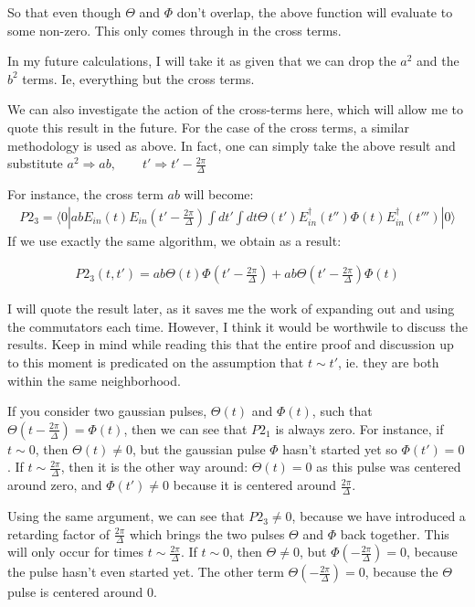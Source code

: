 \documentclass[12pt]{article}
\begin{document}
So that even though $\Theta$ and $\Phi$ don't overlap, the above function will evaluate to some non-zero. This only comes through in the cross terms.

In my future calculations, I will take it as given that we can drop the $a^2$ and the $b^2$ terms. Ie, everything but the cross terms.


We can also investigate the action of the cross-terms here, which will allow me to quote this result in the future. For the case of the cross terms, a similar methodology is used as above. In fact, one can simply take the above result and substitute $a^2 \Rightarrow ab,\qquad t' \Rightarrow t'-\frac{2 \pi}{\Delta}$

For instance, the cross term $ab$ will become:
\begin{align}
P2_3 =\langle 0 | abE_{in}(t) E_{in}(t'-\frac{2 \pi}{\Delta}) \int d t' \int dt \Theta (t') E^\dagger_{in}(t'') \Phi (t) E^\dagger_{in}(t''') | 0\rangle
\end{align}
If we use exactly the same algorithm, we obtain as a result:

\begin{align}
P2_3(t,t') = ab \Theta(t)\Phi(t'-\frac{2 \pi}{\Delta}) + ab \Theta(t'-\frac{2 \pi}{\Delta}) \Phi(t)
\end{align}

I will quote the result later, as it saves me the work of expanding out and using the commutators each time.
However, I think it would be worthwile to discuss the results. Keep in mind while reading this that the entire
proof and discussion up to this moment is predicated on the assumption that $t\sim t'$, ie. they are both
within the same neighborhood.

If you consider two gaussian pulses, $\Theta(t)$ and $\Phi(t)$, such that $\Theta(t-\frac{2 \pi}{\Delta} )= \Phi(t)$, then we can see that $P2_1$ is always zero. For instance, if $t\sim 0$, then $\Theta(t) \neq 0$, but the gaussian pulse $\Phi$ hasn't started yet so $\Phi(t') =0$. If $t\sim \frac{2 \pi}{\Delta}$, then it is the other way around: $\Theta(t) = 0$ as this pulse was centered around zero, and $\Phi(t') \neq 0$ because it is centered around $\frac{2 \pi}{\Delta}$. 

Using the same argument, we can see that $P2_3 \neq 0$, because we have introduced a retarding factor of $\frac{2 \pi}{\Delta}$ which brings the two pulses $\Theta$ and $\Phi$ back together. This will only occur for times $t\sim \frac{2 \pi}{\Delta}$. If $t\sim 0$, then $\Theta \neq 0$, but $\Phi(-\frac{2 \pi }{\Delta} )=0$, because the pulse hasn't even started yet. The other term $\Theta(-\frac{2 \pi}{\Delta}) =0$, because the $\Theta$ pulse is centered around 0.
\end{document}
